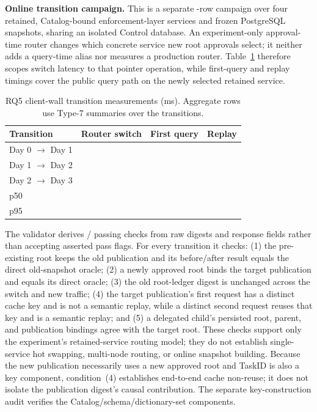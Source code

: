 \documentclass[journal,onecolumn]{IEEEtran}
\newcommand{\code}[1]{\texttt{\detokenize{#1}}}
\begin{document}
\textbf{Online transition campaign.}
This is a separate \RQFiveRows-row campaign over four retained,
Catalog-bound enforcement-layer services and frozen PostgreSQL snapshots, sharing an
isolated Control database. An experiment-only approval-time router changes
which concrete service new root approvals select; it neither adds a query-time
\code{latest} alias nor measures a production router. Table~\ref{tab:rq5-online-supp}
therefore scopes switch latency to that pointer operation, while first-query
and replay timings cover the public query path on the newly selected retained
service.

\begin{table}[t]
\centering
\caption{RQ5 client-wall transition measurements (ms). Aggregate rows use
Type-7 summaries over the \RQFiveTransitions{} transitions.}
\label{tab:rq5-online-supp}
\small
\begin{tabular}{lrrr}
\toprule
Transition & Router switch & First query & Replay \\
\midrule
Day 0 $\rightarrow$ Day 1 & \RQFiveDayZeroToOneSwitchMS{} &
  \RQFiveDayZeroToOneFirstQueryMS{} & \RQFiveDayZeroToOneReplayMS{} \\
Day 1 $\rightarrow$ Day 2 & \RQFiveDayOneToTwoSwitchMS{} &
  \RQFiveDayOneToTwoFirstQueryMS{} & \RQFiveDayOneToTwoReplayMS{} \\
Day 2 $\rightarrow$ Day 3 & \RQFiveDayTwoToThreeSwitchMS{} &
  \RQFiveDayTwoToThreeFirstQueryMS{} & \RQFiveDayTwoToThreeReplayMS{} \\
\midrule
p50 & \RQFiveSwitchMedianMS{} & \RQFiveFirstQueryMedianMS{} &
  \RQFiveReplayMedianMS{} \\
p95 & \RQFiveSwitchTailMS{} & \RQFiveFirstQueryTailMS{} &
  \RQFiveReplayTailMS{} \\
\bottomrule
\end{tabular}
\end{table}

The validator derives \RQFiveChecksPassed{}/\RQFiveChecksTotal{} passing checks
from raw digests and response fields rather than accepting asserted pass flags.
For every transition it checks: (1) the pre-existing root keeps the old
publication and its before/after result equals the direct old-snapshot oracle;
(2) a newly approved root binds the target publication and equals its direct
oracle; (3) the old root-ledger digest is unchanged across the switch and new
traffic; (4) the target publication's first request has a distinct cache key
and is not a semantic replay, while a distinct second request reuses that key
and is a semantic replay; and (5) a delegated child's persisted root, parent,
and publication bindings agree with the target root. These checks support only
the experiment's retained-service routing model; they do not establish
single-service hot swapping, multi-node routing, or online snapshot building.
Because the new publication necessarily uses a new approved root and TaskID is
also a key component, condition~(4) establishes end-to-end cache non-reuse; it
does not isolate the publication digest's causal contribution. The separate
key-construction audit verifies the Catalog/schema/dictionary-set components.
\end{document}
